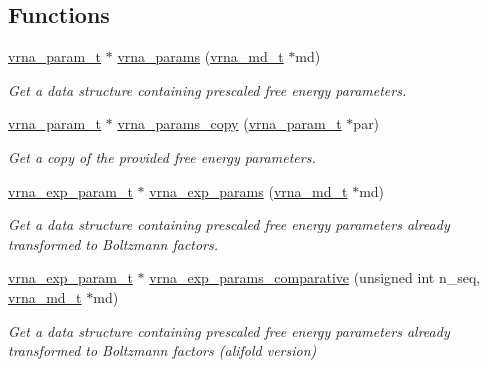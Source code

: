 \subsection*{Functions}
\begin{DoxyCompactItemize}
\item 
\hyperlink{group__energy__parameters_ga8a69ca7d787e4fd6079914f5343a1f35}{vrna\-\_\-param\-\_\-t} $\ast$ \hyperlink{group__energy__parameters_gad0e3e7e74bdc50d1709d40c92993185e}{vrna\-\_\-params} (\hyperlink{group__model__details_ga1f8a10e12a0a1915f2a4eff0b28ea17c}{vrna\-\_\-md\-\_\-t} $\ast$md)
\begin{DoxyCompactList}\small\item\em Get a data structure containing prescaled free energy parameters. \end{DoxyCompactList}\item 
\hyperlink{group__energy__parameters_ga8a69ca7d787e4fd6079914f5343a1f35}{vrna\-\_\-param\-\_\-t} $\ast$ \hyperlink{group__energy__parameters_ga4bffa39f26e7746148444dd8a8426eca}{vrna\-\_\-params\-\_\-copy} (\hyperlink{group__energy__parameters_ga8a69ca7d787e4fd6079914f5343a1f35}{vrna\-\_\-param\-\_\-t} $\ast$par)
\begin{DoxyCompactList}\small\item\em Get a copy of the provided free energy parameters. \end{DoxyCompactList}\item 
\hyperlink{group__energy__parameters_ga01d8b92fe734df8d79a6169482c7d8d8}{vrna\-\_\-exp\-\_\-param\-\_\-t} $\ast$ \hyperlink{group__energy__parameters_gab1f3016f96aa96bff020cdd904605afa}{vrna\-\_\-exp\-\_\-params} (\hyperlink{group__model__details_ga1f8a10e12a0a1915f2a4eff0b28ea17c}{vrna\-\_\-md\-\_\-t} $\ast$md)
\begin{DoxyCompactList}\small\item\em Get a data structure containing prescaled free energy parameters already transformed to Boltzmann factors. \end{DoxyCompactList}\item 
\hyperlink{group__energy__parameters_ga01d8b92fe734df8d79a6169482c7d8d8}{vrna\-\_\-exp\-\_\-param\-\_\-t} $\ast$ \hyperlink{group__energy__parameters_gaf78c09e685e6eef4100b1a41d4042550}{vrna\-\_\-exp\-\_\-params\-\_\-comparative} (unsigned int n\-\_\-seq, \hyperlink{group__model__details_ga1f8a10e12a0a1915f2a4eff0b28ea17c}{vrna\-\_\-md\-\_\-t} $\ast$md)
\begin{DoxyCompactList}\small\item\em Get a data structure containing prescaled free energy parameters already transformed to Boltzmann factors (alifold version) \end{DoxyCompactList}\item 

\end{DoxyCompactItemize}
